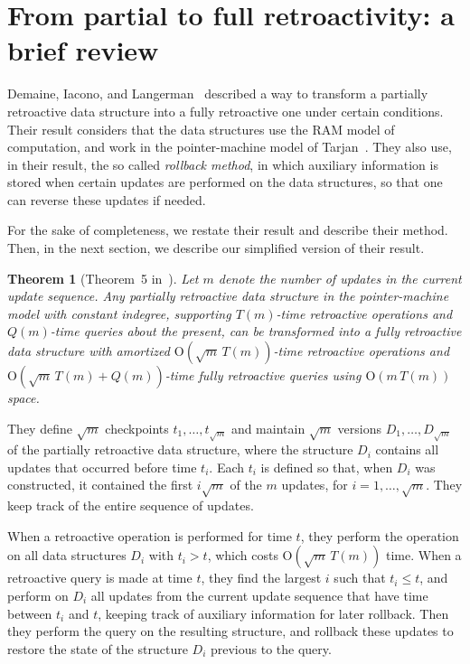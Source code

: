 \documentclass[reqno,11pt]{amsart}
\newtheorem{theorem}              {Theorem}[section]
\newcommand{\Oh}{\mathrm{O}}
\begin{document}
\section{From partial to full retroactivity: a brief review}\label{sec:review}

Demaine, Iacono, and Langerman~\cite{DemaineIL2007} described a way to transform 
a partially retroactive data structure into a fully retroactive one under certain conditions.
Their result considers that the data structures use the RAM model of computation, 
and work in the pointer-machine model of Tarjan~\cite{Tarjan1979}.
They also use, in their result, the so called \emph{rollback method}, in which 
auxiliary information is stored when certain updates are performed on the data
structures, so that one can reverse these updates if needed.

For the sake of completeness, we restate their result and describe their method. 
Then, in the next section, we describe our simplified version of their result. 

\begin{theorem}[Theorem~5 in~\cite{DemaineIL2007}]
  Let $m$ denote the number of updates in the current update sequence. 
  Any partially retroactive data structure in the pointer-machine model with 
  constant indegree, supporting $T(m)$-time retroactive operations and $Q(m)$-time
  queries about the present, can be transformed into a fully retroactive data
  structure with amortized $\Oh(\sqrt{m}\,T(m))$-time retroactive operations and 
  $\Oh(\sqrt{m}\,T(m)+Q(m))$-time fully retroactive queries using $\Oh(m\,T(m))$ space.
\end{theorem}

They define $\sqrt{m}$ checkpoints $t_1,\ldots,t_{\sqrt{m}}$ and maintain $\sqrt{m}$ 
versions $D_1,\ldots,D_{\sqrt{m}}$ of the partially retroactive data structure, 
where the structure $D_i$ contains all updates that occurred before time $t_i$.
Each $t_i$ is defined so that, when $D_i$ was constructed, it contained 
the first $i\sqrt{m}$ of the $m$ updates, for $i=1,\ldots,\sqrt{m}$. 
They keep track of the entire sequence of updates.

When a retroactive operation is performed for time $t$, they perform the operation 
on all data structures $D_i$ with $t_i>t$, which costs $\Oh(\sqrt{m}\,T(m))$ time.  
When a retroactive query is made at time $t$, they find the largest $i$ such that 
$t_i \leq t$, and perform on $D_i$ all updates from the current update sequence that 
have time between $t_i$ and $t$, keeping track of auxiliary information for later rollback. 
Then they perform the query on the resulting structure, and rollback these 
updates to restore the state of the structure $D_i$ previous to the query.
\end{document}
